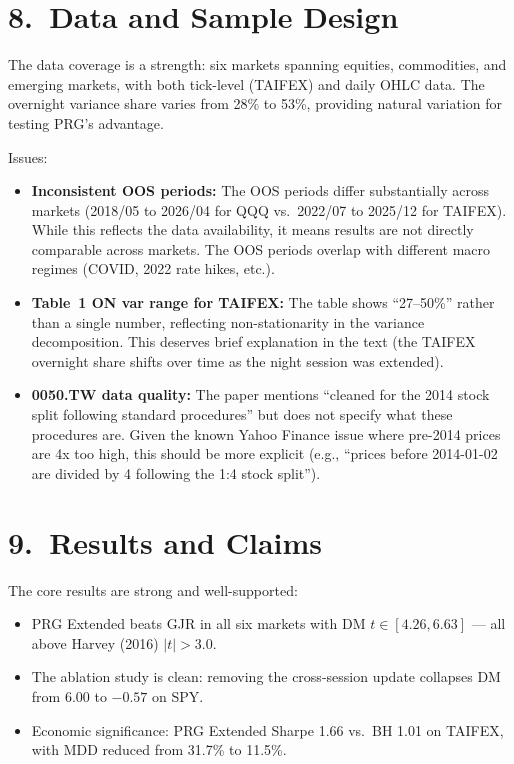 \documentclass[12pt,a4paper]{article}
\begin{document}
\section*{8.\ Data and Sample Design}

\textcolor{okgreen}{The data coverage is a strength:} six markets spanning equities, commodities, and emerging markets, with both tick-level (TAIFEX) and daily OHLC data. The overnight variance share varies from 28\% to 53\%, providing natural variation for testing PRG's advantage.

\textcolor{warncolor}{Issues:}
\begin{itemize}[nosep]
\item \textbf{Inconsistent OOS periods:} The OOS periods differ substantially across markets (2018/05 to 2026/04 for QQQ vs.\ 2022/07 to 2025/12 for TAIFEX). While this reflects the data availability, it means results are not directly comparable across markets. The OOS periods overlap with different macro regimes (COVID, 2022 rate hikes, etc.).
\item \textbf{Table~1 ON var range for TAIFEX:} The table shows ``27--50\%'' rather than a single number, reflecting non-stationarity in the variance decomposition. This deserves brief explanation in the text (the TAIFEX overnight share shifts over time as the night session was extended).
\item \textbf{0050.TW data quality:} The paper mentions ``cleaned for the 2014 stock split following standard procedures'' but does not specify what these procedures are. Given the known Yahoo Finance issue where pre-2014 prices are 4x too high, this should be more explicit (e.g., ``prices before 2014-01-02 are divided by 4 following the 1:4 stock split'').
\end{itemize}


\section*{9.\ Results and Claims}

\textcolor{okgreen}{The core results are strong and well-supported:}
\begin{itemize}[nosep]
\item PRG Extended beats GJR in all six markets with DM $t \in [4.26, 6.63]$ --- all above Harvey (2016) $|t| > 3.0$.
\item The ablation study is clean: removing the cross-session update collapses DM from 6.00 to $-0.57$ on SPY.
\item Economic significance: PRG Extended Sharpe 1.66 vs.\ BH 1.01 on TAIFEX, with MDD reduced from 31.7\% to 11.5\%.
\end{itemize}
\end{document}

